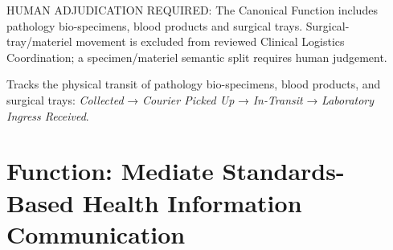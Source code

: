 
HUMAN ADJUDICATION REQUIRED: The Canonical Function includes pathology bio-specimens, blood products and surgical trays. Surgical-tray/\allowbreak{}materiel movement is excluded from reviewed Clinical Logistics Coordination; a specimen/\allowbreak{}materiel semantic split requires human judgement.



Tracks the physical transit of pathology bio-specimens, blood products, and surgical trays: \emph{Collected} → \emph{Courier Picked Up} → \emph{In-Transit} → \emph{Laboratory Ingress Received}.


\section{Function: Mediate Standards-Based Health Information Communication}
\label{function:mediate-standards-based-health-information-communication}
\begingroup\small\setlength{\TableWidth}{\dimexpr\linewidth-6\tabcolsep-4\arrayrulewidth\relax}
